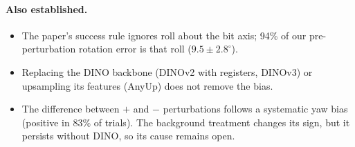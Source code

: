 \documentclass[10pt,a4paper]{article}
\begin{document}
\vspace{-2mm}
\paragraph{Also established.}
\begin{itemize}
\item The paper's success rule ignores roll about the bit axis; 94\% of our pre-perturbation rotation error is that roll ($9.5\pm2.8^\circ$).
\item Replacing the DINO backbone (DINOv2 with registers, DINOv3) or upsampling its features (AnyUp) does not remove the bias.
\item The difference between $+$ and $-$ perturbations follows a systematic yaw bias (positive in 83\% of trials). The background treatment changes its sign, but it persists without DINO, so its cause remains open.
\end{itemize}

\end{document}
